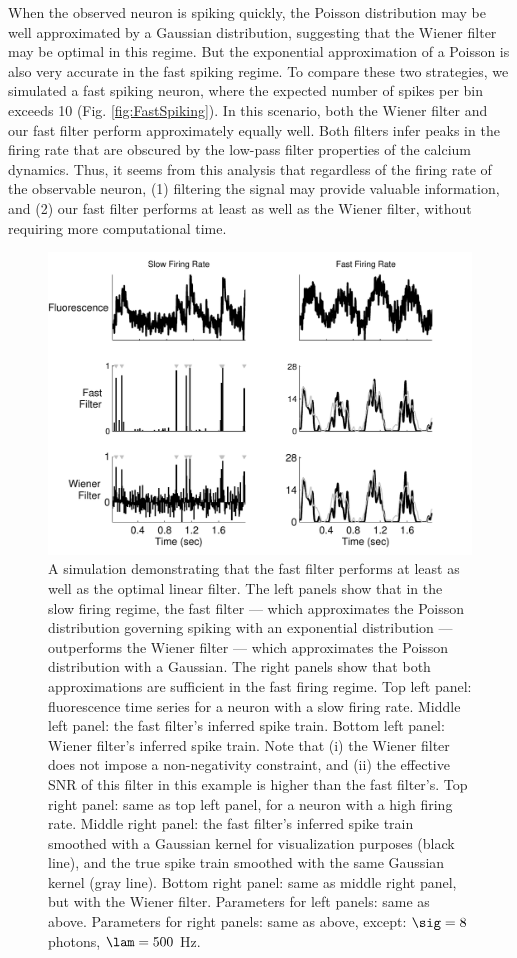 When the observed neuron is spiking quickly, the Poisson distribution may be well approximated by a Gaussian distribution, suggesting that the Wiener filter may be optimal in this regime.  But the exponential approximation of a Poisson is also very accurate in the fast spiking regime.  To compare these two strategies, we simulated a fast spiking neuron, where the expected number of spikes per bin exceeds 10 (Fig. \ref{fig:FastSpiking}). In this scenario, both the Wiener filter and our fast filter perform approximately equally well.  Both filters infer peaks in the firing rate that are obscured by the low-pass filter properties of the calcium dynamics. Thus, it seems from this analysis that regardless of the firing rate of the observable neuron, (1) filtering the signal may provide valuable information, and (2) our fast filter performs at least as well as the Wiener filter, without requiring more computational time.


\begin{figure}[H]
\centering \includegraphics[width=.9\linewidth]{../figs/wiener}
\caption{A simulation demonstrating that the fast filter performs at least as well as the optimal linear filter. The left panels show that in the slow firing  regime, the fast filter --- which approximates the Poisson distribution governing spiking with an exponential distribution  --- outperforms the Wiener filter --- which approximates the Poisson distribution with a Gaussian.  The right panels show that both approximations are sufficient in the fast firing regime. Top left panel: fluorescence time series for a neuron with a slow firing rate.  Middle left panel: the fast filter's inferred spike train.  Bottom left panel: Wiener filter's inferred spike train.  Note that (i) the Wiener filter does not impose a non-negativity constraint, and (ii) the effective SNR of this filter in this example is higher than the fast filter's.  Top right panel: same as top left panel, for a neuron with a high firing rate.  Middle right panel: the fast filter's inferred spike train smoothed with a Gaussian kernel for visualization purposes (black line), and the true spike train smoothed with the same Gaussian kernel (gray line).  Bottom right panel: same as middle right panel, but with the Wiener filter. Parameters for left panels: same as above.  Parameters for right panels: same as above, except: $\sig=8$ photons, $\lam=500$ Hz.} \label{fig:wiener}
\end{figure}

